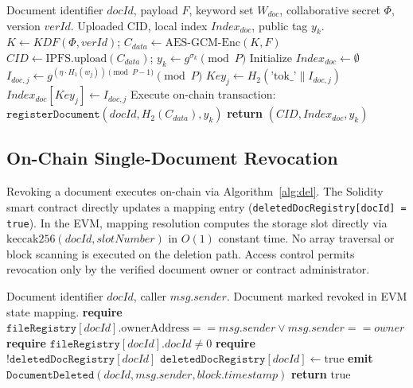 \documentclass[conference]{IEEEtran}
\begin{document}
\begin{algorithm}[htbp]
\caption{SingleDocAdd($docId, F, W_{doc}, \Phi, verId$)}
\label{alg:add}
\begin{algorithmic}[1]
\REQUIRE Document identifier $docId$, payload $F$, keyword set $W_{doc}$, collaborative secret $\Phi$, version $verId$.
\ENSURE Uploaded CID, local index $Index_{doc}$, public tag $y_k$.
\STATE $K \leftarrow KDF(\Phi, verId)$; $C_{data} \leftarrow \text{AES-GCM-Enc}(K, F)$
\STATE $CID \leftarrow \text{IPFS.upload}(C_{data})$; $y_k \leftarrow g^{\sigma_k} \pmod P$
\STATE Initialize $Index_{doc} \leftarrow \emptyset$
    \STATE $I_{doc,j} \leftarrow g^{(\eta \cdot H_1(w_j)) \pmod{P-1}} \pmod P$
    \STATE $Key_j \leftarrow H_2(\text{'tok\_'} \parallel I_{doc,j})$
    \STATE $Index_{doc}[Key_j] \leftarrow I_{doc,j}$
\ENDFOR
\STATE Execute on-chain transaction: $\texttt{registerDocument}(docId, H_2(C_{data}), y_k)$
\STATE \textbf{return} $(CID, Index_{doc}, y_k)$
\end{algorithmic}
\end{algorithm}

\subsection{On-Chain Single-Document Revocation}
Revoking a document executes on-chain via Algorithm~\ref{alg:del}. The Solidity smart contract directly updates a mapping entry (\texttt{deletedDocRegistry[docId] = true}). In the EVM, mapping resolution computes the storage slot directly via $\text{keccak256}(docId, slotNumber)$ in $O(1)$ constant time. No array traversal or block scanning is executed on the deletion path. Access control permits revocation only by the verified document owner or contract administrator.

\begin{algorithm}[htbp]
\caption{SingleDocDelete($docId$) [On-Chain EVM]}
\label{alg:del}
\begin{algorithmic}[1]
\REQUIRE Document identifier $docId$, caller $msg.sender$.
\ENSURE Document marked revoked in EVM state mapping.
\STATE \textbf{require} $\texttt{fileRegistry}[docId].\text{ownerAddress} == msg.sender \lor msg.sender == owner$
\STATE \textbf{require} $\texttt{fileRegistry}[docId].docId \neq 0$
\STATE \textbf{require} $!\texttt{deletedDocRegistry}[docId]$
\STATE $\texttt{deletedDocRegistry}[docId] \leftarrow \text{true}$
\STATE \textbf{emit} $\texttt{DocumentDeleted}(docId, msg.sender, block.timestamp)$
\STATE \textbf{return} $\text{true}$
\end{algorithmic}
\end{algorithm}
\end{document}

